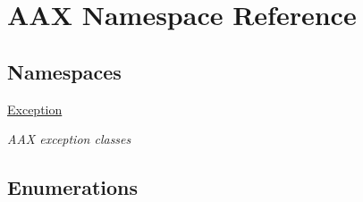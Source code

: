\hypertarget{a00288}{}\section{A\+A\+X Namespace Reference}
\label{a00288}
\subsection*{Namespaces}
\begin{DoxyCompactItemize}
\item 
 \hyperlink{a00320}{Exception}
\begin{DoxyCompactList}\small\item\em A\+A\+X exception classes \end{DoxyCompactList}\end{DoxyCompactItemize}
\subsection*{Enumerations}

